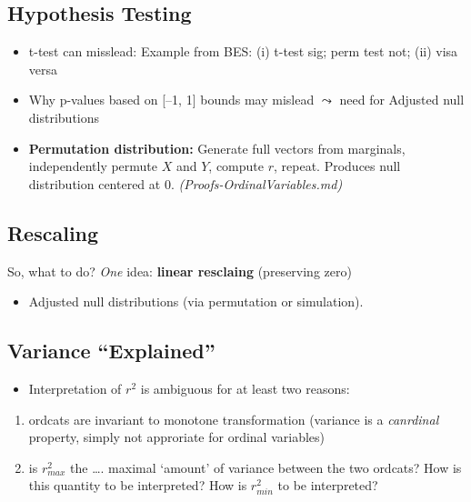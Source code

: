 \documentclass[
  12pt,
]{article}
\providecommand{\tightlist}{%
  \setlength{\itemsep}{0pt}\setlength{\parskip}{0pt}}
\theoremstyle{plain}
\theoremstyle{definition}
\theoremstyle{remark}
\begin{document}
\subsection{Hypothesis Testing}\label{hypothesis-testing}

\begin{itemize}
\tightlist
\item
  t-test can misslead: Example from BES: (i) t-test sig; perm test not;
  (ii) visa versa
\item
  Why p-values based on {[}--1, 1{]} bounds may mislead \(\leadsto\)
  need for Adjusted null distributions
\item
  \textbf{Permutation distribution:} Generate full vectors from
  marginals, independently permute \(X\) and \(Y\), compute \(r\),
  repeat. Produces null distribution centered at 0.
  \emph{(Proofs-OrdinalVariables.md)}
\end{itemize}

\subsection{Rescaling}\label{rescaling}

So, what to do? \emph{One} idea: \textbf{linear resclaing} (preserving
zero)

\begin{itemize}
\tightlist
\item
  Adjusted null distributions (via permutation or simulation).
\end{itemize}

\subsection{Variance ``Explained''}\label{variance-explained}

\begin{itemize}
\tightlist
\item
  Interpretation of \(r^2\) is ambiguous for at least two reasons:
\end{itemize}

\begin{enumerate}
\def\labelenumi{\arabic{enumi}.}
\tightlist
\item
  ordcats are invariant to monotone transformation (variance is a
  \emph{canrdinal} property, simply not approriate for ordinal
  variables)
\item
  is \(r^2_{max}\) the \ldots. maximal `amount' of variance between the
  two ordcats? How is this quantity to be interpreted? How is
  \(r^2_{min}\) to be interpreted?
\end{enumerate}
\end{document}

